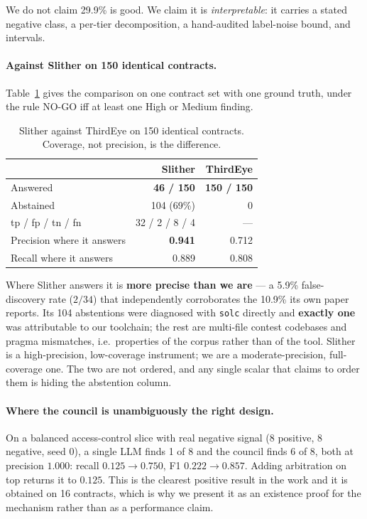 \documentclass[sigconf,nonacm]{acmart}
\newcommand{\tool}{ThirdEye}
\begin{document}
We do not claim 29.9\% is good. We claim it is \emph{interpretable}: it carries a
stated negative class, a per-tier decomposition, a hand-audited label-noise
bound, and intervals.

\paragraph{Against Slither on 150 identical contracts.}
Table~\ref{tab:slither} gives the comparison on one contract set with one ground
truth, under the rule NO-GO iff at least one High or Medium finding.

\begin{table}[t]
\centering
\caption{Slither against \tool{} on 150 identical contracts. Coverage, not
precision, is the difference.}
\label{tab:slither}
\small
\begin{tabular}{@{}lrr@{}}
\toprule
& \textbf{Slither} & \textbf{\tool{}} \\
\midrule
Answered & \textbf{46 / 150} & \textbf{150 / 150} \\
Abstained & 104 (69\%) & 0 \\
tp / fp / tn / fn & 32 / 2 / 8 / 4 & --- \\
Precision where it answers & \textbf{0.941} & 0.712 \\
Recall where it answers & 0.889 & 0.808 \\
\bottomrule
\end{tabular}
\end{table}

Where Slither answers it is \textbf{more precise than we are} --- a 5.9\%
false-discovery rate ($2/34$) that independently corroborates the 10.9\% its own
paper reports. Its 104 abstentions were diagnosed with \texttt{solc} directly and
\textbf{exactly one} was attributable to our toolchain; the rest are multi-file
contest codebases and pragma mismatches, i.e.\ properties of the corpus rather
than of the tool. Slither is a high-precision, low-coverage instrument; we are a
moderate-precision, full-coverage one. The two are not ordered, and any single
scalar that claims to order them is hiding the abstention column.

\paragraph{Where the council is unambiguously the right design.}
On a balanced access-control slice with real negative signal (8 positive, 8
negative, seed 0), a single LLM finds 1 of 8 and the council finds 6 of 8, both at
precision $1.000$: recall $0.125 \rightarrow 0.750$, F1
$0.222 \rightarrow 0.857$. Adding arbitration on top returns it to $0.125$. This
is the clearest positive result in the work and it is obtained on 16 contracts,
which is why we present it as an existence proof for the mechanism rather than as
a performance claim.
\end{document}
